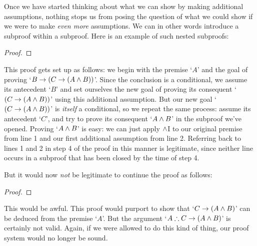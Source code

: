 
Once we have started thinking about what we can show by making additional assumptions, nothing stops us from posing the question of what we could show if we were to make \emph{even more} assumptions. We can in other words introduce a subproof within a subproof. Here is an example of such nested subproofs:
\begin{proof}
\open
	\open
	\close
\close
{}
\end{proof}
This proof gets set up as follows: we begin with the premise `$A$' and the goal of proving `$B \rightarrow (C \rightarrow (A \wedge B))$'.  Since the conclusion is a conditional, we assume its antecedent `$B$' and set ourselves the new goal of proving its consequent `$(C \rightarrow (A \wedge B))$' using this additional assumption.  But our new goal `$(C \rightarrow (A \wedge B))$' is \emph{itself} a conditional, so we repeat the same process: assume its antecedent `$C$', and try to prove its consequent `$A \wedge B$' in the subproof we've opened.  Proving `$A \wedge B$' is easy: we can just apply $\wedge $I to our original premise from line 1 and our first additional assumption from line 2.  Referring back to lines 1 and 2 in step 4 of the proof in this manner is legitimate,  since neither line occurs in a subproof that has been closed by the time of step 4.

But it would now \emph{not} be legitimate to continue the proof as follows:
\begin{proof}
\open
	\open
	\close
\close
{}
\end{proof}
This would be awful. This proof would purport to show that `$C \rightarrow (A \wedge B)$' can be deduced from the premise `$A$'.  But the argument  `$A \therefore C \rightarrow (A \wedge B)$' is certainly not valid. Again, if we were allowed to do this kind of thing, our proof system would no longer be sound. 

